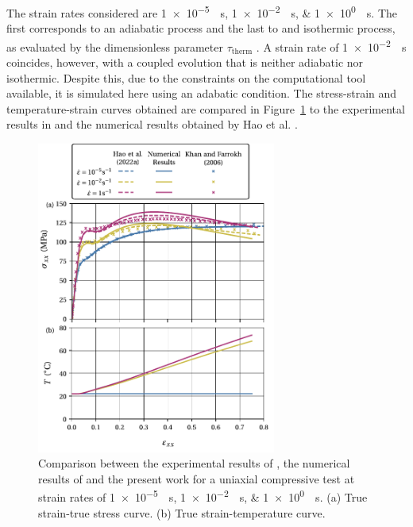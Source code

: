 The strain rates considered are \SIlist{1e-5;1e-2;1e0}{\per\second}.
The first corresponds to an adiabatic process and the last to and isothermic process, as evaluated by the dimensionless parameter $\tau_\text{therm}$ \citep{haoUnifiedAmorphousCrystalline2022}.
A strain rate of \SI{1e-2}{\per\second} coincides, however, with a coupled evolution that is neither adiabatic nor isothermic.
Despite this, due to the constraints on the computational tool available, it is simulated here using an adabatic condition.
The stress-strain and temperature-strain curves obtained are compared in Figure~\ref{fig:stress_temp_strain_hao_results} to the experimental results in \cite{khanThermomechanicalResponseNylon2006} and the numerical results obtained by Hao et al. \citep{haoUnifiedAmorphousCrystalline2022}.
\begin{figure}[htbp]
  \centering
  \includegraphics[width=0.7\textwidth]{figures/stress_temp_strain_hao_results}
  \caption{Comparison between the experimental results of \cite{khanThermomechanicalResponseNylon2006}, the numerical results of \cite{haoUnifiedAmorphousCrystalline2022} and the present work for a uniaxial compressive test at strain rates of \SIlist{1e-5;1e-2;1e0}{\per\second}. (a) True strain-true stress curve. (b) True strain-temperature curve.}
\label{fig:stress_temp_strain_hao_results}
\end{figure}


